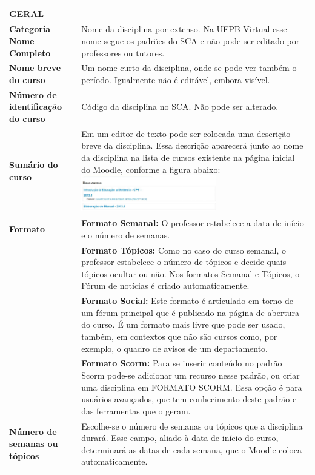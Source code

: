 \begin{longtable}[htbp] {p{6cm}|p{9cm}}
  \hline
 \rowcolor[rgb]{0.8,0.8,0.8} \textbf{GERAL} &\\
 \hline
\textbf{Categoria Nome Completo} & Nome da disciplina por extenso. Na UFPB Virtual esse nome segue os padrões do SCA e não pode ser editado por professores ou tutores.\\
\hline

\textbf{Nome breve do curso} & Um nome curto da disciplina, onde se pode ver também o período. Igualmente não é editável, embora visível.\\\hline

\textbf{Número de identificação do curso} & Código da disciplina no SCA. Não pode ser alterado.\\\hline

\textbf{Sumário do curso} & Em um editor de texto pode ser colocada uma descrição breve da disciplina. Essa descrição aparecerá junto ao nome da disciplina na lista de cursos existente na página inicial do Moodle, conforme a figura abaixo:
\includegraphics[width=0.6\textwidth]{imagem/cap3/fig25.jpg}\\\hline
\textbf{Formato} & \textbf{Formato Semanal: }
O professor estabelece a data de início e o número de semanas.\\
& \textbf{Formato Tópicos: }
Como no caso do curso semanal, o professor estabelece o número de tópicos e decide quais tópicos ocultar ou não.
Nos formatos Semanal e Tópicos, o Fórum de notícias é criado automaticamente.\\
& \textbf{Formato Social: }
Este formato é articulado em torno de um fórum principal que é publicado na página de abertura do curso. É um formato mais livre que pode ser usado, também, em contextos que não são cursos como, por exemplo, o quadro de avisos de um departamento.\\
& \textbf{Formato Scorm: }
Para se inserir conteúdo no padrão Scorm pode-se adicionar um recurso nesse padrão, ou criar uma disciplina em FORMATO SCORM. Essa opção é para usuários avançados, que tem conhecimento deste padrão e das ferramentas que o geram.
\\\hline
\textbf{Número de semanas ou tópicos} & Escolhe-se o número de semanas ou tópicos que a disciplina durará. Esse campo, aliado à data de início do curso, determinará as datas de cada semana, que o Moodle coloca automaticamente.\\\hline

\end{longtable}
